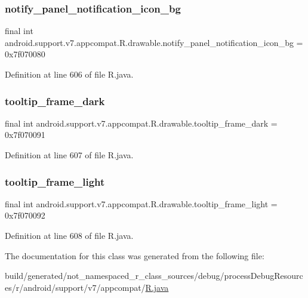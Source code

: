 \subsubsection{\texorpdfstring{notify\_panel\_notification\_icon\_bg}{notify\_panel\_notification\_icon\_bg}}
{\footnotesize\ttfamily final int android.\+support.\+v7.\+appcompat.\+R.\+drawable.\+notify\+\_\+panel\+\_\+notification\+\_\+icon\+\_\+bg = 0x7f070080\hspace{0.3cm}{\ttfamily [static]}}



Definition at line 606 of file R.\+java.

\mbox{\label{classandroid_1_1support_1_1v7_1_1appcompat_1_1_r_1_1drawable_a5e1e725970e14ba17cf3ba19a4fccdc9}} 
\subsubsection{\texorpdfstring{tooltip\_frame\_dark}{tooltip\_frame\_dark}}
{\footnotesize\ttfamily final int android.\+support.\+v7.\+appcompat.\+R.\+drawable.\+tooltip\+\_\+frame\+\_\+dark = 0x7f070091\hspace{0.3cm}{\ttfamily [static]}}



Definition at line 607 of file R.\+java.

\mbox{\label{classandroid_1_1support_1_1v7_1_1appcompat_1_1_r_1_1drawable_a0f8038bc0517156c3d94469744a30f8a}} 
\subsubsection{\texorpdfstring{tooltip\_frame\_light}{tooltip\_frame\_light}}
{\footnotesize\ttfamily final int android.\+support.\+v7.\+appcompat.\+R.\+drawable.\+tooltip\+\_\+frame\+\_\+light = 0x7f070092\hspace{0.3cm}{\ttfamily [static]}}



Definition at line 608 of file R.\+java.



The documentation for this class was generated from the following file\+:\begin{DoxyCompactItemize}
\item 
build/generated/not\+\_\+namespaced\+\_\+r\+\_\+class\+\_\+sources/debug/process\+Debug\+Resources/r/android/support/v7/appcompat/\mbox{\hyperlink{android_2support_2v7_2appcompat_2_r_8java}{R.\+java}}\end{DoxyCompactItemize}

